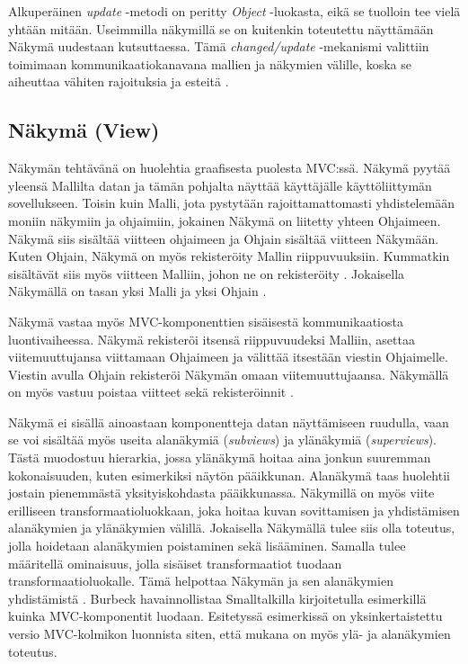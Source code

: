 \documentclass[utf8]{gradu3}
\begin{document}
Alkuperäinen \textit{update} -metodi on peritty \textit{Object} -luokasta, eikä se tuolloin tee vielä yhtään mitään. Useimmilla näkymillä se on kuitenkin toteutettu näyttämään Näkymä uudestaan kutsuttaessa. Tämä \textit{changed/update} -mekanismi valittiin toimimaan kommunikaatiokanavana mallien ja näkymien välille, koska se aiheuttaa vähiten rajoituksia ja esteitä \parencite{burbeck}. 


\subsection{Näkymä (View)}
Näkymän tehtävänä on huolehtia graafisesta puolesta MVC:ssä. Näkymä pyytää yleensä Mallilta datan ja tämän pohjalta näyttää käyttäjälle käyttöliittymän sovellukseen. Toisin kuin Malli, jota pystytään rajoittamattomasti yhdistelemään moniin näkymiin ja ohjaimiin, jokainen Näkymä on liitetty yhteen Ohjaimeen. Näkymä siis sisältää viitteen ohjaimeen ja Ohjain sisältää viitteen Näkymään. Kuten Ohjain, Näkymä on myös rekisteröity Mallin riippuvuuksiin. Kummatkin sisältävät siis myös viitteen Malliin, johon ne on rekisteröity \parencite{burbeck}. Jokaisella Näkymällä on tasan yksi Malli ja yksi Ohjain \parencite[s. 7]{krasner_desc}.

Näkymä vastaa myös MVC-komponenttien sisäisestä kommunikaatiosta luontivaiheessa. Näkymä rekisteröi itsensä riippuvuudeksi Malliin, asettaa viitemuuttujansa viittamaan Ohjaimeen ja välittää itsestään viestin Ohjaimelle. Viestin avulla Ohjain rekisteröi Näkymän omaan viitemuuttujaansa. Näkymällä on myös vastuu poistaa viitteet sekä rekisteröinnit \parencite{burbeck}. 

Näkymä ei sisällä ainoastaan komponentteja datan näyttämiseen ruudulla, vaan se voi sisältää myös useita alanäkymiä (\emph{subviews}) ja ylänäkymiä (\emph{superviews}). Tästä muodostuu hierarkia, jossa ylänäkymä hoitaa aina jonkun suuremman kokonaisuuden, kuten esimerkiksi näytön pääikkunan. Alanäkymä taas huolehtii jostain pienemmästä yksityiskohdasta pääikkunassa. Näkymillä on myös viite erilliseen transformaatioluokkaan, joka hoitaa kuvan sovittamisen ja yhdistämisen alanäkymien ja ylänäkymien välillä. Jokaisella Näkymällä tulee siis olla toteutus, jolla hoidetaan alanäkymien poistaminen sekä lisääminen. Samalla tulee määritellä ominaisuus, jolla sisäiset transformaatiot tuodaan transformaatioluokalle. Tämä helpottaa Näkymän ja sen alanäkymien yhdistämistä \parencite[s. 8]{krasner_desc}. Burbeck havainnollistaa Smalltalkilla kirjoitetulla esimerkillä kuinka MVC-komponentit luodaan. Esitetyssä esimerkissä on yksinkertaistettu versio MVC-kolmikon luonnista siten, että mukana on myös ylä- ja alanäkymien toteutus.
\end{document}
